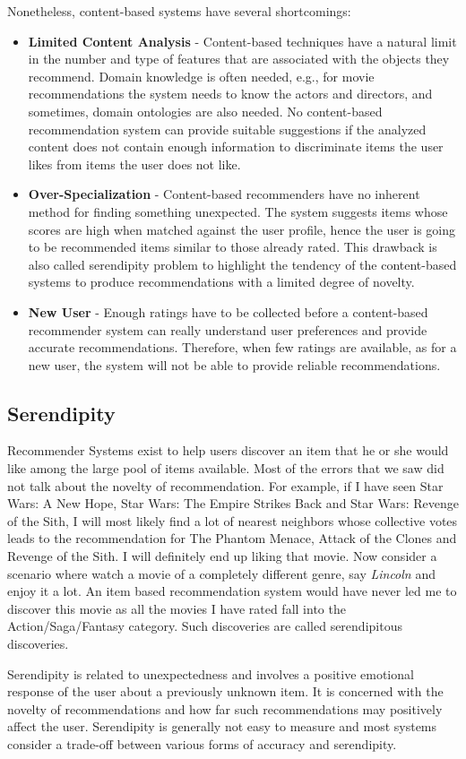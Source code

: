  Nonetheless, content-based systems have several shortcomings:
\begin{itemize}
\item \textbf{Limited Content Analysis} - Content-based techniques have a natural limit in the number and type of features that are associated with the objects they recommend. Domain knowledge is often needed, e.g., for movie recommendations the system needs to know the actors and directors, and sometimes, domain ontologies are also needed. No content-based recommendation system can provide suitable suggestions if the analyzed content does not contain enough information to discriminate items the user likes from items the user does not like.
\end{itemize}
\begin{itemize}
\item \textbf{Over-Specialization} - Content-based recommenders have no inherent method for finding something unexpected. The system suggests items whose scores are high when matched against the user profile, hence the user is going to be recommended items similar to those already rated. This drawback is also called serendipity problem to highlight the tendency of the content-based systems to produce recommendations with a limited degree of novelty.
\end{itemize}
\begin{itemize}
\item \textbf{New User} - Enough ratings have to be collected before a content-based recommender system can really understand user preferences and provide accurate recommendations. Therefore, when few ratings are available, as for a new user, the system will not be able to provide reliable recommendations.
\end{itemize}

  \subsection{Serendipity}
  Recommender Systems exist to help users discover an item that he or she would like among the large pool of items available. Most of the errors that we saw did not talk about the novelty of recommendation. For example, if I have seen Star Wars: A New Hope, Star Wars: The Empire Strikes Back and Star Wars: Revenge of the Sith, I will most likely find a lot of nearest neighbors whose collective votes leads to the recommendation for The Phantom Menace, Attack of the Clones and Revenge of the Sith. I will definitely end up liking that movie. Now consider a scenario where watch a movie of a completely different genre, say \textit{Lincoln} and enjoy it a lot. An item based recommendation system would have never led me to discover this movie as all the movies I have rated fall into the Action/Saga/Fantasy category. Such discoveries are called serendipitous discoveries. 

Serendipity is related to unexpectedness and involves a positive emotional response of the user about a previously unknown item. It is concerned with the novelty of recommendations and how far such recommendations may positively affect the user. Serendipity is generally not easy to measure and most systems consider a trade-off between various forms of accuracy and serendipity. 
% 

